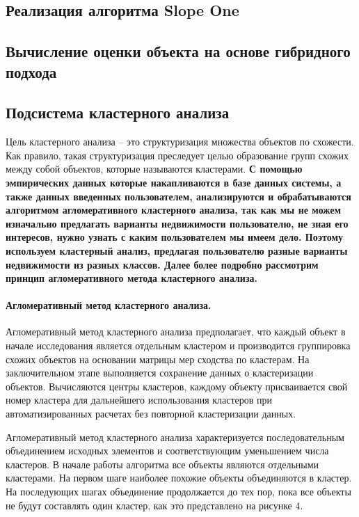 \documentclass[a4paper,14pt,openany,final]{extreport} %
\begin{document}
\subsection{Реализация алгоритма Slope One}
\subsection{Вычисление оценки объекта на основе гибридного подхода}
\subsection{Подсистема кластерного анализа}

Цель кластерного анализа -- это структуризация множества объектов по схожести. Как правило, такая структуризация преследует целью образование групп схожих между собой объектов, которые называются кластерами. \textbf{С помощью эмпирических данных которые накапливаются в базе данных системы, а также данных введенных пользователем, анализируются и обрабатываются алгоритмом агломеративного кластерного анализа, так как мы не можем изначально предлагать варианты недвижимости пользователю, не зная его интересов, нужно узнать с каким пользователем мы имеем дело. Поэтому используем кластерный анализ, предлагая пользователю разные варианты недвижимости из разных классов. Далее более подробно рассмотрим принцип агломеративного метода кластерного анализа.}

\paragraph{Агломеративный метод кластерного анализа.}
Агломеративный метод кластерного анализа предполагает, что каждый объект в начале исследования является отдельным кластером и производится группировка схожих объектов на основании матрицы мер сходства по кластерам. На заключительном этапе выполняется сохранение данных о кластеризации объектов. Вычисляются центры кластеров, каждому объекту присваивается свой номер кластера для дальнейшего использования кластеров при автоматизированных расчетах без повторной кластеризации данных.

Агломеративный метод кластерного анализа характеризуется последовательным объединением исходных элементов и соответствующим уменьшением числа кластеров. В начале работы алгоритма все объекты являются отдельными кластерами. На первом шаге наиболее похожие объекты объединяются в кластер. На последующих шагах объединение продолжается до тех пор, пока все объекты не будут составлять один кластер, как это представлено на рисунке 4.
\end{document}
